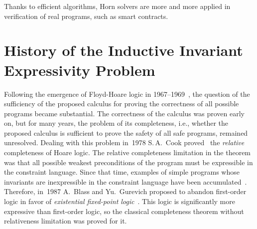 Thanks to efficient algorithms, Horn solvers are more and more applied in verification of real programs, such as smart contracts.

\section{History of the Inductive Invariant Expressivity Problem}\label{sec:background/historyExpressivity}
Following the emergence of Floyd-Hoare logic in \numrange{1967}{1969}~\cite{Floyd1993,10.1145/363235.363259}, the question of the sufficiency of the proposed calculus for proving the correctness of all possible programs became substantial. The correctness of the calculus was proven early on, but for many years, the problem of its completeness, i.e., whether the proposed calculus is sufficient to prove the safety of all safe programs, remained unresolved. Dealing with this problem in~1978 S.\,A.~Cook proved~\cite{doi:10.1137/0207005} the \emph{relative} completeness of Hoare logic.
The relative completeness limitation in the theorem was that all possible weakest preconditions of the program must be expressible in the constraint language.
Since that time, examples of simple programs whose invariants are inexpressible in the constraint language have been accumulated~\cite{10.1145/371282.371285}.
Therefore, in~1987 A.~Blass and Yu.~Gurevich proposed to abandon first-order logic in favor of \emph{existential fixed-point logic}~\cite{Blass1987,blass2000the}. This logic is significantly more expressive than first-order logic, so the classical completeness theorem without relativeness limitation was proved for it.



